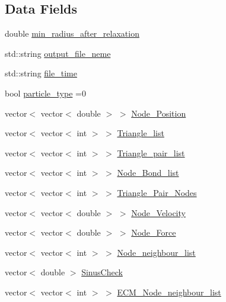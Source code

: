 \subsection*{Data Fields}
\begin{DoxyCompactItemize}
\item 
double \mbox{\hyperlink{classMembrane_a78f183bfa7a6cf6a1bb1b25cdc56a0fa}{min\+\_\+radius\+\_\+after\+\_\+relaxation}}
\item 
std\+::string \mbox{\hyperlink{classMembrane_ad2926e36f86391bae373ce0c4ee2803e}{output\+\_\+file\+\_\+neme}}
\item 
std\+::string \mbox{\hyperlink{classMembrane_acbb91c512db54a2b7fca3a5706eff781}{file\+\_\+time}}
\item 
bool \mbox{\hyperlink{classMembrane_a5c68010e05af51bba32b0407bddda5cd}{particle\+\_\+type}} =0
\item 
vector$<$ vector$<$ double $>$ $>$ \mbox{\hyperlink{classMembrane_a71d4c2117b63d8145b236bd51668033f}{Node\+\_\+\+Position}}
\item 
vector$<$ vector$<$ int $>$ $>$ \mbox{\hyperlink{classMembrane_ad61d1fbb53ef3a3fb7b4670581327051}{Triangle\+\_\+list}}
\item 
vector$<$ vector$<$ int $>$ $>$ \mbox{\hyperlink{classMembrane_ad4f0d5f17a9f50e1505e4264ba6e139a}{Triangle\+\_\+pair\+\_\+list}}
\item 
vector$<$ vector$<$ int $>$ $>$ \mbox{\hyperlink{classMembrane_a653506414e86b70ec87450c4639abaa5}{Node\+\_\+\+Bond\+\_\+list}}
\item 
vector$<$ vector$<$ int $>$ $>$ \mbox{\hyperlink{classMembrane_a16c7d8283b2b53178f1c0c8c8a3fe0cf}{Triangle\+\_\+\+Pair\+\_\+\+Nodes}}
\item 
vector$<$ vector$<$ double $>$ $>$ \mbox{\hyperlink{classMembrane_ac6661af8931b8e555f4cb9fbdcb394d0}{Node\+\_\+\+Velocity}}
\item 
vector$<$ vector$<$ double $>$ $>$ \mbox{\hyperlink{classMembrane_a3c1eb46e7611377e2cef72ff17255e32}{Node\+\_\+\+Force}}
\item 
vector$<$ vector$<$ int $>$ $>$ \mbox{\hyperlink{classMembrane_a705770b79289d894b0b58919e810d71a}{Node\+\_\+neighbour\+\_\+list}}
\item 
vector$<$ double $>$ \mbox{\hyperlink{classMembrane_a593abb7d67c62b99eba2b0d15dcb0c19}{Sinus\+Check}}
\item 
vector$<$ vector$<$ int $>$ $>$ \mbox{\hyperlink{classMembrane_a8995874c931ce5448b6a158bde6fc819}{E\+C\+M\+\_\+\+Node\+\_\+neighbour\+\_\+list}}
\item 

\end{DoxyCompactItemize}
